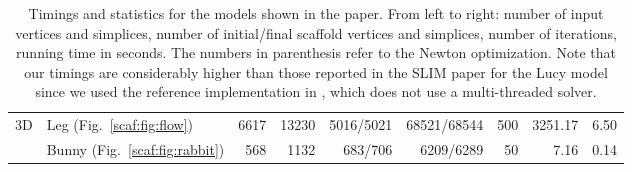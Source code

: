 \begin{table*}[t]
\begin{adjustbox}{width=\columnwidth,totalheight=\textheight,keepaspectratio}
\begin{tabular}{llrrrrrrr}
\multirow{2}{*}{3D}&Leg (Fig.~\ref{scaf:fig:flow})
&6617&13230&5016/5021&68521/68544&500&3251.17&6.50\\
&Bunny (Fig.~\ref{scaf:fig:rabbit})
&568&1132&683/706&6209/6289&50&7.16&0.14\\

\hline
	\end{tabular}
	\end{adjustbox}
			\caption{Timings and statistics for the models shown in the paper. From left to right: number of input vertices and simplices, number of initial/final scaffold vertices and simplices, number of iterations, running time in seconds. The numbers in parenthesis refer to the Newton optimization. Note that our timings are considerably higher than those reported in the SLIM paper for the Lucy model since we used the reference implementation in \protect\cite{libigl}, which {does not use} a multi-threaded solver.}
	\label{tab:timings}
	\vspace{-0.2cm}
\end{table*}
